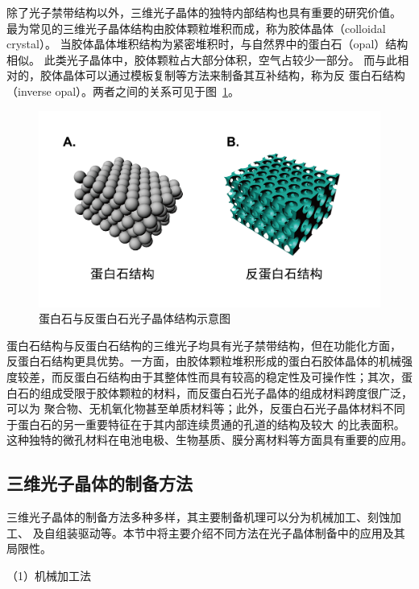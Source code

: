 除了光子禁带结构以外，三维光子晶体的独特内部结构也具有重要的研究价值。
最为常见的三维光子晶体结构由胶体颗粒堆积而成，称为胶体晶体（colloidal crystal）。
当胶体晶体堆积结构为紧密堆积时，与自然界中的蛋白石（opal）结构相似。
此类光子晶体中，胶体颗粒占大部分体积，空气占较少一部分。
而与此相对的，胶体晶体可以通过模板复制等方法来制备其互补结构，称为反
蛋白石结构（inverse opal）。两者之间的关系可见于图~\ref{fig:opal_inv_opal}。
\begin{figure}[htbp]
	\centering
	\includegraphics[width=0.75\linewidth]{figures/opalvsinv.png}
	\caption{蛋白石与反蛋白石光子晶体结构示意图}
	\label{fig:opal_inv_opal}
\end{figure}
蛋白石结构与反蛋白石结构的三维光子均具有光子禁带结构，但在功能化方面，
反蛋白石结构更具优势。一方面，由胶体颗粒堆积形成的蛋白石胶体晶体的机械强度较差，而反蛋白石结构由于其整体性而具有较高的稳定性及可操作性；其次，蛋白石的组成受限于胶体颗粒的材料，而反蛋白石光子晶体的组成材料跨度很广泛，可以为
聚合物、无机氧化物甚至单质材料\cite{Meseguer2002Synthesis,Stein2013Design}等；此外，反蛋白石光子晶体材料不同于蛋白石的另一重要特征在于其内部连续贯通的孔道的结构及较大
的比表面积。这种独特的微孔材料在电池电极\cite{Kang2012Inverse,Zhou2014Photoelectrodes}、生物基质\cite{Lu2014Hybrid,Kim2014CellFriendly}、膜分离材料\cite{Kim2014Inverse,Kang2014LiquidImpermeable}等方面具有重要的应用。

\subsection{三维光子晶体的制备方法}
\label{subsec:3Dpreparation}
三维光子晶体的制备方法多种多样，其主要制备机理可以分为机械加工、刻蚀加工、
及自组装驱动等。本节中将主要介绍不同方法在光子晶体制备中的应用及其局限性。

（1）机械加工法

